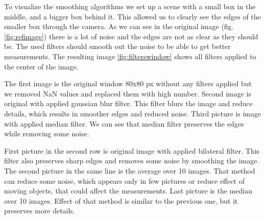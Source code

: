 \documentclass[11pt]{article}
\begin{document}
To visualize the smoothing algorithms we set up a scene with a small box in the
middle, and a bigger box behind it. This allowed us to clearly see the edges of
the smaller box through the camera. As we can see in the original image
(fig. \vref{fig:refimage}) there is a lot of noise and the edges are not as
clear as they should be. The used filters should smooth out the noise to be able
to get better measurements. The resulting image \vref{fig:filterswindow} shows
all filters applied to the center of the image. \par

The first image is the original window 80x80 px without any filters applied but
we removed NaN values and replaced them with high number. Second image is
original with applied gaussian blur filter. This filter blurs the image and
reduce details, which results in smoother edges and reduced noise. Third picture
is image with applied median filter. We can see that median filter preserves the
edges while removing some noise. \par

First picture in the second row is original image with applied bilateral
filter. This filter also preserves sharp edges and removes some noise by
smoothing the image. The second picture in the same line is the average over 10
images. That method can reduce some noise, which appears only in few pictures or
reduce effect of moving objects, that could affect the measurements. Last
picture is the median over 10 images. Effect of that method is similar to the
previous one, but it preserves more details.
\end{document}
